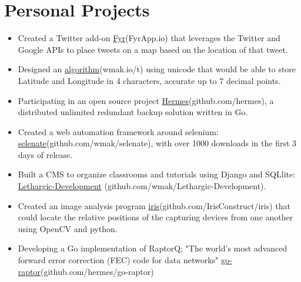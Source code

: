 \documentclass[a4paper, 10pt]{article}
\begin{document}
\section{\bf{Personal Projects}}
\begin{itemize}
    \item Created a Twitter add-on \href{http://FyrApp.io}{Fyr}(FyrApp.io) that leverages the Twitter and Google APIs to place tweets on a map based on the location of that tweet.
    \item Designed an \href{http://wmak.io/t.html}{algorithm}(wmak.io/t) using unicode that would be able to store Latitude and Longitude in 4 characters, accurate up to 7 decimal points.
    \item Participating in an open source project \href{https://github.com/hermes/hermes}{Hermes}(github.com/hermes), a distributed unlimited redundant backup solution written in Go.
    \item Created a web automation framework around selenium: \href{https://github.com/wmak/selenate}{selenate}(github.com/wmak/selenate), with over 1000 downloads in the first 3 days of release.
    \item Built a CMS to organize classrooms and tutorials using Django and SQLlite: \\ \href{https://github.com/wmak/Lethargic-Development}{Lethargic-Development} (github.com/wmak/Lethargic-Development).
    \item Created an image analysis program \href{https://github.com/IrisConstruct/iris}{iris}(github.com/IrisConstruct/iris) that could locate the relative positions of the capturing devices from one another using OpenCV and python.
    \item Developing a Go implementation of RaptorQ; "The world’s most advanced forward error correction (FEC) code for data networks" \href{https://github.com/hermes/go-raptor}{go-raptor}(github.com/hermes/go-raptor)
\end{itemize}
\end{document}
